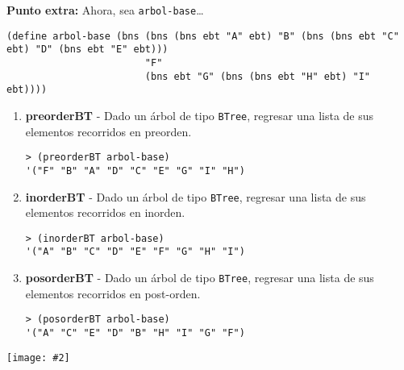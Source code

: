 \documentclass{article}
\newcommand{\jimage}[2]{\texttt{[image: \#2]}\vskip10pt}
\begin{document}
\newpage
\textbf{Punto extra:}
Ahora, sea \verb;arbol-base;\dots
\begin{verbatim}
(define arbol-base (bns (bns (bns ebt "A" ebt) "B" (bns (bns ebt "C" ebt) "D" (bns ebt "E" ebt))) 
                        "F"
                        (bns ebt "G" (bns (bns ebt "H" ebt) "I" ebt))))
\end{verbatim}

\begin{enumerate}
\item  \textbf{preorderBT} - Dado un árbol de tipo \verb;BTree;, regresar una lista de sus elementos recorridos en preorden.
\begin{verbatim}
> (preorderBT arbol-base)
'("F" "B" "A" "D" "C" "E" "G" "I" "H")
\end{verbatim}

\item  \textbf{inorderBT}  - Dado un árbol de tipo \verb;BTree;, regresar una lista de sus elementos recorridos en inorden.
\begin{verbatim}
> (inorderBT arbol-base)
'("A" "B" "C" "D" "E" "F" "G" "H" "I")
\end{verbatim}

\item \textbf{posorderBT} - Dado un árbol de tipo \verb;BTree;, regresar una lista de sus elementos recorridos en post-orden.
\begin{verbatim}
> (posorderBT arbol-base)
'("A" "C" "E" "D" "B" "H" "I" "G" "F")
\end{verbatim}
   
\end{enumerate}

\jimage{0.8}{imgs/orders.png}
\end{document}
